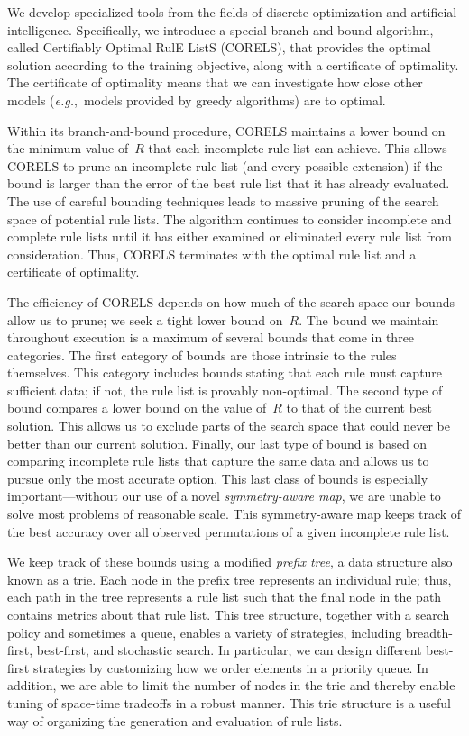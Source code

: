 \documentclass[twoside,11pt]{article}
\def\eg{{\it e.g.},~}
\begin{document}
We develop specialized tools from the fields of discrete optimization and artificial intelligence.
%
Specifically, we introduce a special branch-and bound algorithm, called
Certifiably Optimal RulE ListS (CORELS), that provides the optimal solution
according to the training objective, along with a certificate of optimality.
%
The certificate of optimality means that we can investigate how close other models
(\eg models provided by greedy algorithms) are to optimal.

\begin{arxiv}
Within its branch-and-bound procedure, CORELS maintains a lower bound on the
minimum value of~$R$ that each incomplete rule list can achieve.
%
This allows CORELS to prune an incomplete rule list (and every possible extension)
if the bound is larger than the error of the best rule list that it has already evaluated.
%
The use of careful bounding techniques leads to massive pruning of
the search space of potential rule lists.
%
The algorithm continues to consider incomplete and complete rule lists until it has either
examined or eliminated every rule list from consideration.
%
Thus, CORELS terminates with the optimal rule list and a certificate of optimality.
\end{arxiv}

The efficiency of CORELS depends on how much of the search space our bounds
allow us to prune; we seek a tight lower bound on~$R$.
%
The bound we maintain throughout execution is a maximum of several bounds
that come in three categories.
%
The first category of bounds are those intrinsic to the rules themselves.
%
This category includes bounds stating that each rule must capture sufficient data;
if not, the rule list is provably non-optimal.
%
The second type of bound compares a lower bound on the value of~$R$
to that of the current best solution.
%
This allows us to exclude parts of the search space that could never be better
than our current solution.
%
Finally, our last type of bound is based on comparing incomplete rule lists that
capture the same data and allows us to pursue only the most accurate option.
%
This last class of bounds is especially important---without our use of a novel
\textit{symmetry-aware map}, we are unable to solve most problems of reasonable scale.
%
This symmetry-aware map keeps track of the best accuracy
over all observed permutations of a given incomplete rule list.

We keep track of these bounds using a modified \emph{prefix tree},
a data structure also known as a trie.
%
Each node in the prefix tree represents an individual rule;
thus, each path in the tree represents a rule list such that
the final node in the path contains metrics about that rule list.
%
This tree structure, together with a search policy and sometimes a queue,
enables a variety of strategies, including breadth-first,
best-first, and stochastic search.
%
In particular, we can design different best-first strategies
by customizing how we order elements in a priority queue.
%
In addition, we are able to limit the number of nodes in the trie
and thereby enable tuning of space-time tradeoffs in a robust manner.
%
This trie structure is a useful way of organizing the generation
and evaluation of rule lists.
\end{document}
